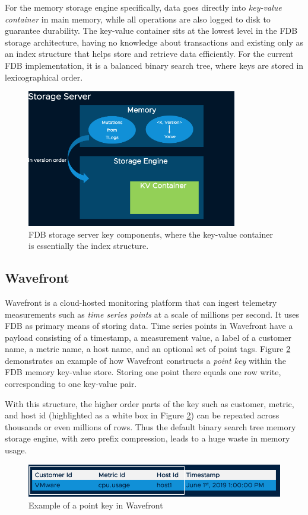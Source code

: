 \documentclass[sigplan,screen,nonacm]{acmart}
\begin{document}
For the memory storage engine specifically, data goes directly into {\itshape key-value container} in main memory, while all operations are also logged to disk to guarantee durability.  The key-value container sits at the lowest level in the FDB storage architecture, having no knowledge about transactions and existing only as an index structure that helps store and retrieve data efficiently. For the  current FDB implementation, it is a balanced binary search tree, where keys are stored in lexicographical order. 
\begin{figure}[t]
  \centering
  \includegraphics[width=\linewidth, height=6cm]{pic/FDB-storage-architecture.png}
  \setlength{\abovecaptionskip}{-10pt} 
  \setlength{\belowcaptionskip}{-7pt} 
  \caption{FDB storage server key components, where the key-value container is essentially the index structure.}
  \label{fig:FDB-storage-architecture}
\end{figure}

\subsection{Wavefront}
Wavefront \cite{wavefront} is a cloud-hosted monitoring platform that can ingest telemetry measurements such as {\itshape time series points} at a scale of millions per second. It uses FDB as primary means of storing data. Time series points in Wavefront have a payload consisting of a timestamp, a measurement value, a label of a customer name, a metric name, a host name, and an optional set of point tags. Figure \ref{fig:point-key} demonstrates an example of how Wavefront constructs a {\itshape point key} within the FDB memory key-value store. Storing one point there equals one row write, corresponding to one key-value pair.  

With this structure, the higher order parts of the key such as customer, metric, and host id (highlighted as a white box in Figure \ref{fig:point-key}) can be repeated across thousands or even millions of rows.  Thus the default binary search tree memory storage engine, with zero prefix compression, leads to a huge waste in memory usage. 
\begin{figure}[h]
  \centering
  \includegraphics[width=\linewidth]{pic/point key.png}
  \setlength{\abovecaptionskip}{-10pt} 
  \setlength{\belowcaptionskip}{-7pt} 
  \caption{Example of a point key in Wavefront}
  \label{fig:point-key}
\end{figure}
\end{document}
